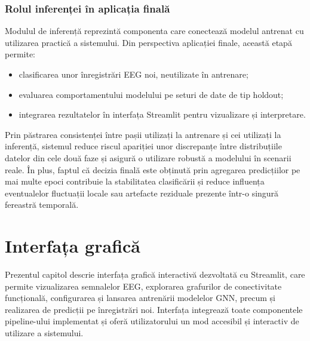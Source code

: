 \documentclass[12pt,a4paper]{report}
\theoremstyle{definition}
\theoremstyle{remark}
\begin{document}
\subsection{Rolul inferenței în aplicația finală}

Modulul de inferență reprezintă componenta care conectează modelul antrenat cu utilizarea practică a sistemului. Din perspectiva aplicației finale, această etapă permite:
\begin{itemize}
    \item clasificarea unor înregistrări EEG noi, neutilizate în antrenare;
    \item evaluarea comportamentului modelului pe seturi de date de tip holdout;
    \item integrarea rezultatelor în interfața Streamlit pentru vizualizare și interpretare.
\end{itemize}

Prin păstrarea consistenței între pașii utilizați la antrenare și cei utilizați la inferență, sistemul reduce riscul apariției unor discrepanțe între distribuțiile datelor din cele două faze și asigură o utilizare robustă a modelului în scenarii reale. În plus, faptul că decizia finală este obținută prin agregarea predicțiilor pe mai multe epoci contribuie la stabilitatea clasificării și reduce influența eventualelor fluctuații locale sau artefacte reziduale prezente într-o singură fereastră temporală.

\chapter{Interfața grafică}

Prezentul capitol descrie interfața grafică interactivă dezvoltată cu Streamlit, care permite vizualizarea semnalelor EEG, explorarea grafurilor de conectivitate funcțională, configurarea și lansarea antrenării modelelor GNN, precum și realizarea de predicții pe înregistrări noi. Interfața integrează toate componentele pipeline-ului implementat și oferă utilizatorului un mod accesibil și interactiv de utilizare a sistemului.
\end{document}
